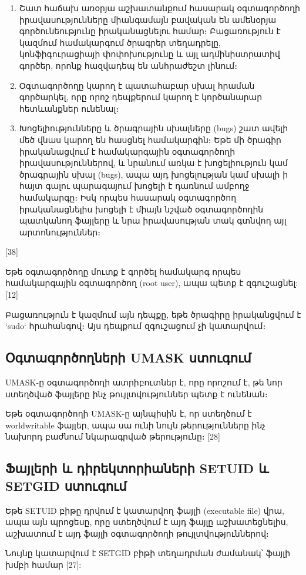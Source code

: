 \documentclass[a4paper,12pt]{article}
\begin{document}
\begin{sloppypar}
\begin{enumerate}
\item Շատ հաճախ առօրյա աշխատանքում հասարակ օգտագործողի իրավասությունները
	միանգամայն բավական են ամենօրյա գործունեությունը իրականացնելու համար։
	Բացառություն է կազմում համակարգում ծրագրեր տեղադրելը, կոնֆիգուրացիայի
	փոփոխությունը և այլ ադմինիստրատիվ գործեր, որոնք հազվադեպ են անհրաժեշտ
	լինում։
\item Օգտագործողը կարող է պատահաբար սխալ հրաման գործարկել, որը որոշ
	դեպքերում կարող է կործանարար հետևանքներ ունենալ։
\item Խոցելիությունները և ծրագրային սխալները (bugs) շատ ավելի մեծ վնաս կարող են
	հասցնել համակարգին։ Եթե մի ծրագիր իրականացվում է համակարգային
	օգտագործողի իրավասություններով, և նրանում առկա է խոցելիություն կամ
	ծրագրային սխալ (bugs), ապա այդ խոցելության կամ սխալի ի հայտ գալու պարագայում
	խոցելի է դառնում ամբողջ համակարգը։ Իսկ որպես հասարակ օգտագործող
	իրականացնելիս խոցելի է միայն նշված օգտագործողին պատկանող ֆայլերը և
	նրա իրավասության տակ գտնվող այլ արտոնություններ։
\end{enumerate}
[38]

Եթե օգտագործողը մուտք է գործել համակարգ որպես
համակարգային օգտագործող (root user), ապա պետք է զգուշացնել: [12]

Բացառություն է կազմում այն դեպքը, եթե ծրագիրը իրականցվում է
`sudo` հրահանգով։ Այս դեպքում զգուշացում չի կատարվում։



\subsection{Օգտագործողների UMASK ստուգում}


UMASK-ը օգտագործողի ատրիբուտներ է, որը
որոշում է, թե նոր ստեղծված ֆայլերը ինչ թույլտվություններ
պետք է ունենան։

Եթե օգտագործողի UMASK-ը այնպիսին է, որ ստեղծում է
worldwritable ֆայլեր, ապա սա ունի նույն թերությունները
ինչ նախորդ բաժնում նկարագրված թերությունը։
[28]


\subsection{Ֆայլերի և դիրեկտորիաների SETUID և SETGID ստուգում}


Եթե SETUID բիթը դրվում է կատարվող ֆայլի (executable file) վրա, ապա
այն պրոցեսը, որը ստեղծվում է այդ ֆայլը աշխատեցնելիս,
աշխատում է այդ ֆայլի օգտագործողի թույլտվություններով։

Նույնը կատարվում է SETGID բիթի տեղադրման ժամանակ՝
ֆայլի խմբի համար [27]:



\end{sloppypar}
\end{document}
